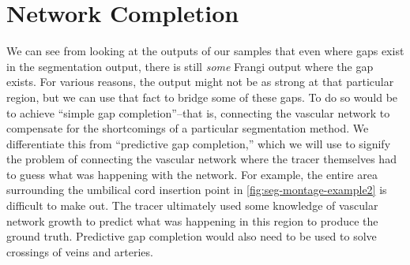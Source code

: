 %
%
%
\section{Network Completion} \label{sec:network-completion}
We can see from looking at the \Vmax outputs of our samples that even where gaps exist in the segmentation output, there is still \textit{some} Frangi output where the gap exists. For various reasons, the output might not be as strong at that particular region, but we can use that fact to bridge some of these gaps. To do so would be to achieve ``simple gap completion''--that is, connecting the vascular network to compensate for the shortcomings of a particular segmentation method. We differentiate this from ``predictive gap completion,'' which we will use to signify the problem of connecting the vascular network where the tracer themselves had to guess what was happening with the network. For example, the entire area surrounding the umbilical cord insertion point in \cref{fig:seg-montage-example2} is difficult to make out. The tracer ultimately used some knowledge of vascular network growth to predict what was happening in this region to produce the ground truth. Predictive gap completion would also need to be used to solve crossings of veins and arteries.


